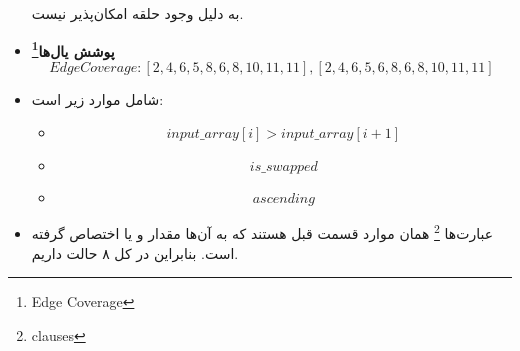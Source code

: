 \begin{itemize}
	به دلیل وجود حلقه امکان‌پذیر نیست.
	\item \textbf{پوشش یال‌ها\footnote{Edge Coverage}}
	\begin{equation*}
		Edge Coverage: {[2, 4, 6, 5, 8, 6, 8, 10, 11, 11], [2, 4, 6, 5, 6, 8, 6, 8, 10, 11, 11]}
	\end{equation*}
	
	\item 
	شامل موارد زیر است:
	\begin{itemize}
		\item 
		\begin{equation*}
			input\_array[i] > input\_array[i + 1]
		\end{equation*}
		\item 
		\begin{equation*}
			is\_swapped
		\end{equation*}
		\item 
		\begin{equation*}
			ascending
		\end{equation*}
	\end{itemize}
	\item 
	عبارت‌ها \footnote{clauses}
	همان موارد قسمت قبل هستند که به آن‌ها مقدار  و یا  اختصاص گرفته است. بنابراین در کل ۸ حالت داریم. 
\end{itemize}